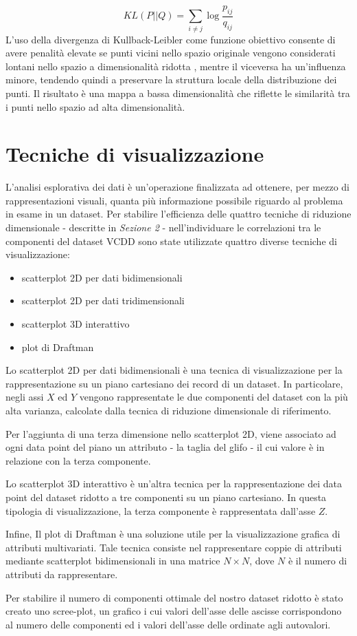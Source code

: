 \documentclass[11pt,a4paper,twocolumn]{article}
\begin{document}
\begin{equation}
\nonumber
KL(P\lvert \lvert Q)=\sum_{i \neq j}{\log{\frac{p_{ij}}{q_{ij}}}}
\end{equation}
L'uso della divergenza di Kullback-Leibler come funzione obiettivo consente di avere penalità elevate se punti vicini nello spazio originale  vengono considerati lontani nello spazio a dimensionalità ridotta , mentre il viceversa ha un'influenza minore, tendendo quindi a preservare la struttura locale della distribuzione dei punti. Il risultato è una mappa a bassa dimensionalità che riflette le similarità tra i punti nello spazio ad alta dimensionalità.
\section{Tecniche di visualizzazione}
	L'analisi esplorativa dei dati è un'operazione finalizzata ad ottenere, per mezzo di rappresentazioni visuali, quanta più informazione possibile riguardo al problema in esame in un dataset.
	Per stabilire l'efficienza delle quattro tecniche di riduzione dimensionale - descritte in \emph{Sezione 2} - nell'individuare le correlazioni tra le componenti del dataset VCDD sono state utilizzate quattro diverse tecniche di visualizzazione:

	\begin{itemize}
		\item scatterplot 2D per dati bidimensionali
		\item scatterplot 2D per dati tridimensionali
		\item scatterplot 3D interattivo
		\item plot di Draftman
	\end{itemize}

	Lo scatterplot 2D per dati bidimensionali è una tecnica di visualizzazione per la rappresentazione su un piano cartesiano dei record di un dataset. In particolare, negli assi $X$ ed $Y$ vengono rappresentate le due componenti del dataset con la più alta varianza, calcolate dalla tecnica di riduzione dimensionale di riferimento. \par
	Per l'aggiunta di una terza dimensione nello scatterplot 2D, viene associato ad ogni data point del piano un attributo - la taglia del glifo - il cui valore è in relazione con la terza componente. \par
	Lo scatterplot 3D interattivo è un'altra tecnica per la rappresentazione dei data point del dataset ridotto a tre componenti su un piano cartesiano. In questa tipologia di visualizzazione, la terza componente è rappresentata dall'asse $ Z $. \par
	Infine, Il plot di Draftman è una soluzione utile per la visualizzazione grafica di attributi multivariati. Tale tecnica consiste nel rappresentare coppie di attributi mediante scatterplot bidimensionali in una matrice $ N \times N $, dove $ N $ è il numero di attributi da rappresentare. \par
	Per stabilire il numero di componenti ottimale del nostro dataset ridotto è stato creato uno scree-plot, un grafico i cui valori dell'asse delle ascisse corrispondono al numero delle componenti ed i valori dell'asse delle ordinate agli autovalori.
\end{document}
